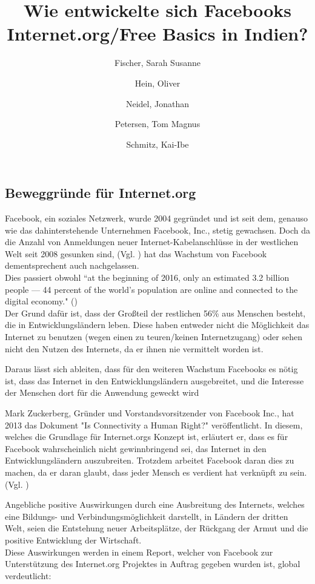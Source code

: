 \documentclass{article}
\title{Wie entwickelte sich Facebooks Internet.org/Free Basics in Indien?}
\author{
  Fischer, Sarah Susanne\\
  \and
  Hein, Oliver\\
  \and
  Neidel, Jonathan\\
  \and
  Petersen, Tom Magnus\\
  \and
  Schmitz, Kai-Ibe\\
}
\begin{document}
\subsection{Beweggründe für Internet.org}
Facebook, ein soziales Netzwerk, wurde 2004 gegründet und ist seit dem, genauso wie das dahinterstehende Unternehmen Facebook, Inc., stetig gewachsen. 
Doch da die Anzahl von Anmeldungen neuer Internet-Kabelanschlüsse in der westlichen Welt seit 2008 gesunken sind,
(Vgl. \cite{ICTslowingDown}) hat das Wachstum von Facebook dementsprechent auch nachgelassen.\\
Dies passiert obwohl ``at the beginning of 2016, only an estimated 3.2 billion people — 44 percent of the world’s population are online and connected to the digital economy." (\cite{connectWorld})\\
Der Grund dafür ist, dass der Großteil der restlichen 56\% aus Menschen besteht, die in Entwicklungsländern leben. Diese haben entweder nicht die Möglichkeit das Internet zu benutzen (wegen einen zu teuren/keinen Internetzugang) oder sehen nicht den Nutzen des Internets, da er ihnen nie vermittelt worden ist.

\medskip

Daraus lässt sich ableiten, dass für den weiteren Wachstum Facebooks es nötig ist, dass das Internet in den Entwicklungsländern ausgebreitet, und die Interesse der Menschen dort für die Anwendung geweckt wird

\medskip
Mark Zuckerberg, Gründer und Vorstandsvorsitzender von Facebook Inc., hat 2013 das Dokument "Is Connectivity a Human Right?" veröffentlicht.
In diesem, welches die Grundlage für Internet.orgs Konzept ist, erläutert er, dass es für Facebook wahrscheinlich nicht gewinnbringend sei, das Internet in den Entwicklungsländern auszubreiten. Trotzdem arbeitet Facebook daran dies zu machen, da er daran glaubt, dass jeder Mensch es verdient hat verknüpft zu sein.(Vgl. \cite{HumanRight})

\medskip

Angebliche positive Auswirkungen durch eine Ausbreitung des Internets, welches eine Bildungs- und Verbindungsmöglichkeit darstellt, in Ländern der dritten Welt, seien die Entstehung neuer Arbeitsplätze, der Rückgang der Armut und die positive Entwicklung der Wirtschaft.\\
    
Diese Auswirkungen werden in einem Report, welcher von Facebook zur Unterstützung des Internet.org Projektes in Auftrag gegeben wurden ist, global verdeutlicht:
                    
\end{document}
